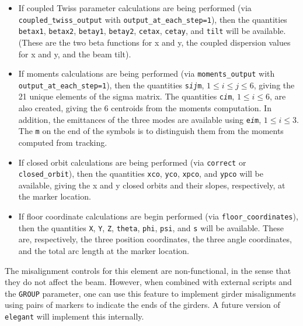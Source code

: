 \begin{itemize}
  {\tt alphax}, {\tt betax}, {\tt nux}, {\tt etax}, {\tt etapx}, and {\tt etaxp}, along with similarly-named
  quantities for the vertical plane, will be available, giving twiss parameter values at the marker location.
  Note that {\tt etapx} and {\tt etaxp} are the same, being alternate names for $\eta_x^\prime$.  If radiation integrals are requested,
  the values of the radiation integrals are available in the quantities {\tt I1}, {\tt I2}, etc.
\item If coupled Twiss parameter calculations are being performed (via {\tt coupled\_twiss\_output} with {\tt output\_at\_each\_step=1}),
  then the quantities  \verb|betax1|, \verb|betax2|, \verb|betay1|, \verb|betay2|, \verb|cetax|, \verb|cetay|, and \verb|tilt| will be available.
  (These are the two beta functions for x and y, the coupled dispersion values for x and y, and the beam tilt). 
\item If moments calculations are being performed (via {\tt moments\_output} with  {\tt output\_at\_each\_step=1}), then the quantities 
 {\tt s{\em i}{\em j}m}, $1 \leq i\leq j\leq 6$, giving the 21 unique elements of the sigma matrix.  The quantities {\tt c{\em i}m}, $1\leq i \leq 6$,
 are also created, giving the 6 centroids from the moments computation. In addition, the emittances of the three modes are available using 
 {\tt e{\em i}m}, $1\leq i \leq 3$. The {\tt m} on the end of the symbols is to distinguish them from the moments computed from tracking.
\item If closed orbit calculations are being performed (via {\tt correct} or {\tt closed\_orbit}), then
  the quantities {\tt xco}, {\tt yco}, {\tt xpco}, and {\tt ypco} will be available, giving the
  x and y closed orbits and their slopes, respectively, at the marker location.
\item If floor coordinate calculations are begin performed (via {\tt floor\_coordinates}), then the quantities
  {\tt X}, {\tt Y}, {\tt Z}, {\tt theta}, {\tt phi}, {\tt psi}, and {\tt s} will be available.  These are,
  respectively, the three position coordinates, the three angle coordinates, and the total arc length
  at the marker location.
\end{itemize}

The misalignment controls for this element are non-functional, in the sense that they do not affect the beam.
However, when combined with external scripts and the \verb|GROUP| parameter, one can use this feature to
implement girder misalignments using pairs of markers to indicate the ends of the girders.  A future version
of {\tt elegant} will implement this internally.
